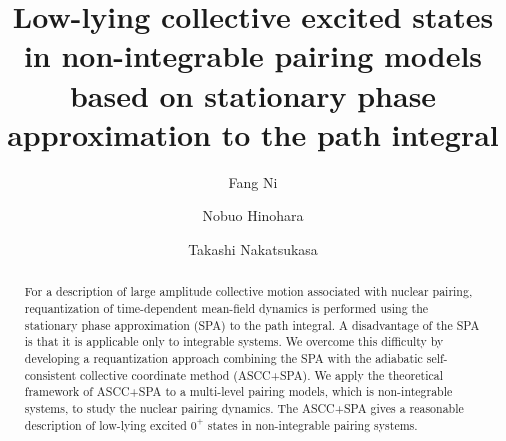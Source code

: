 \documentclass[%
superscriptaddress,
showpacs,
nofootinbib,
amsmath,amssymb,
aps,
prc,
twocolumn,
floatfix ]%
{revtex4-1}
\begin{document}
\renewcommand{\thefootnote}{\fnsymbol{footnote}}

\title{Low-lying collective excited states in non-integrable pairing models
based on stationary phase approximation to the path integral}%

\author{Fang Ni}
\author{Nobuo Hinohara}
\author{Takashi Nakatsukasa}

\begin{abstract}
For a description of large amplitude collective motion associated with
nuclear pairing, requantization of time-dependent mean-field dynamics
is performed using the stationary phase approximation (SPA) to the path
integral.
A disadvantage of the SPA is that it is applicable only to integrable systems.
We overcome this difficulty by developing a requantization approach
combining the SPA with the adiabatic
self-consistent collective coordinate method (ASCC+SPA).
We apply the theoretical framework of ASCC+SPA to 
a multi-level pairing models, which is non-integrable systems,
to study the nuclear pairing dynamics.
The ASCC+SPA gives a reasonable description of low-lying excited $0^+$
states in non-integrable pairing systems.
\end{abstract}

\maketitle
\end{document}
